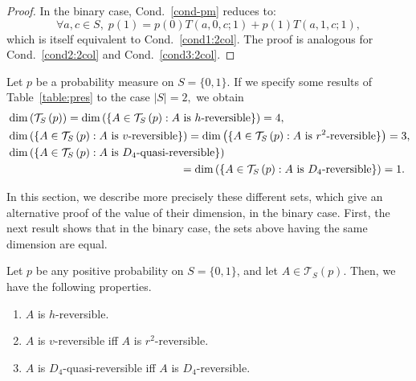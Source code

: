 \documentclass[AHL,Unicode,longabstracts]{cedram}
\newcounter{a}
\newcommand{\Cond}{Cond.}
\newcommand{\triang}[2]{\mathcal{T}_{#1} \left(#2 \right)}
\let\oldforall\forall
\renewcommand*{\forall}{\mathrel{\oldforall}}
\begin{document}
\begin{proof}
In the binary case, \Cond~\ref{cond-pm} reduces to: 
\[
\forall a,c\in S, \; p(1)=p(0)T(a,0,c;1)+p(1)T(a,1,c;1),
\]
which is itself equivalent to \Cond~\ref{cond1:2col}. The proof is analogous for \Cond~\ref{cond2:2col} and \Cond~\ref{cond3:2col}.
\end{proof}

Let $p$ be a probability measure on $S=\{0,1\}$. If we specify some results of Table~\ref{table:pres} to the case $|S|=2,$ we obtain
\begin{align*}
& \dim \left(\triang{S}{p} \right) = \dim \left(\{A \in \triang{S}{p} : A \text{ is $h$-reversible}\} \right) = 4,\\
& \dim \left(\{A \in \triang{S}{p} : A \text{ is $v$-reversible}\} \right) = \dim \left(\{A \in \triang{S}{p} : A \text{ is $r^2$-reversible}\} \right) = 3,\\
& \dim \left(\{A \in \triang{S}{p} : A \text{ is $D_4$-quasi-reversible}\} \right) \\
&\mkern 280mu =\dim \left(\{A \in \triang{S}{p} : A \text{ is $D_4$-reversible}\} \right) = 1.
\end{align*}

In this section, we describe more precisely these different sets, which give an alternative proof of the value of their dimension, in the binary case. First, the next result shows that in the binary case, the sets above having the same dimension are equal.

\begin{prop}
Let $p$ be any positive probability on $S=\{0,1\}$, and let $A\in\triang{S}{p}$. Then, we have the following properties.
\begin{enumerate}
\item \label{list7.2.1}$A$ is $h$-reversible.
\item \label{list7.2.2}$A$ is $v$-reversible iff $A$ is $r^2$-reversible.
\item \label{list7.2.3}$A$ is $D_4$-quasi-reversible iff $A$ is $D_4$-reversible.
\end{enumerate}
\end{prop}
\end{document}
